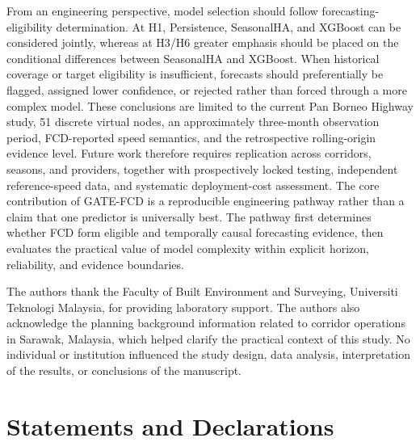 \documentclass[pdflatex,sn-mathphys-num,iicol]{sn-jnl}
\begin{document}
From an engineering perspective, model selection should follow forecasting-eligibility determination. At H1, Persistence, SeasonalHA, and XGBoost can be considered jointly, whereas at H3/H6 greater emphasis should be placed on the conditional differences between SeasonalHA and XGBoost. When historical coverage or target eligibility is insufficient, forecasts should preferentially be flagged, assigned lower confidence, or rejected rather than forced through a more complex model. These conclusions are limited to the current Pan Borneo Highway study, 51 discrete virtual nodes, an approximately three-month observation period, FCD-reported speed semantics, and the retrospective rolling-origin evidence level. Future work therefore requires replication across corridors, seasons, and providers, together with prospectively locked testing, independent reference-speed data, and systematic deployment-cost assessment. The core contribution of GATE-FCD is a reproducible engineering pathway rather than a claim that one predictor is universally best. The pathway first determines whether FCD form eligible and temporally causal forecasting evidence, then evaluates the practical value of model complexity within explicit horizon, reliability, and evidence boundaries.



\backmatter




The authors thank the Faculty of Built Environment and Surveying, Universiti Teknologi Malaysia, for providing laboratory support. The authors also acknowledge the planning background information related to corridor operations in Sarawak, Malaysia, which helped clarify the practical context of this study. No individual or institution influenced the study design, data analysis, interpretation of the results, or conclusions of the manuscript.



\section*{Statements and Declarations}
\end{document}
